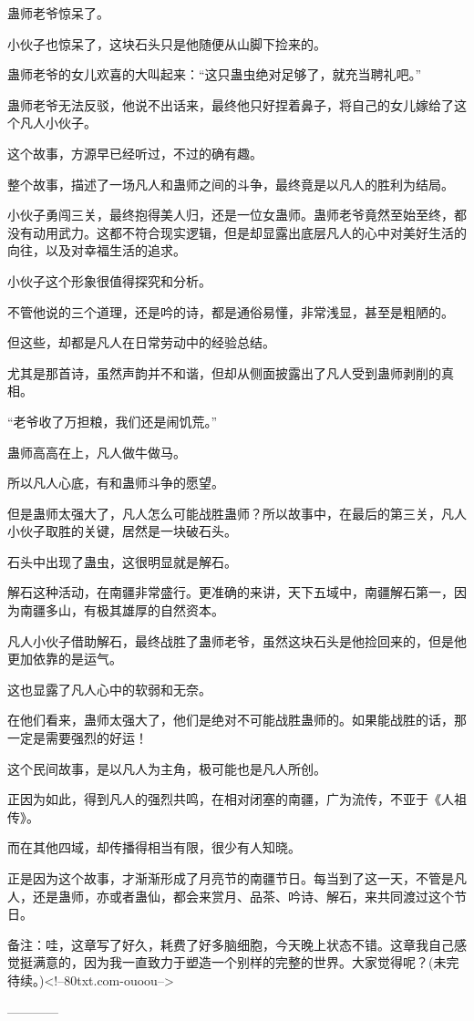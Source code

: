 \begin{this_body}
蛊师老爷惊呆了。

小伙子也惊呆了，这块石头只是他随便从山脚下捡来的。

蛊师老爷的女儿欢喜的大叫起来：“这只蛊虫绝对足够了，就充当聘礼吧。”

蛊师老爷无法反驳，他说不出话来，最终他只好捏着鼻子，将自己的女儿嫁给了这个凡人小伙子。

这个故事，方源早已经听过，不过的确有趣。

整个故事，描述了一场凡人和蛊师之间的斗争，最终竟是以凡人的胜利为结局。

小伙子勇闯三关，最终抱得美人归，还是一位女蛊师。蛊师老爷竟然至始至终，都没有动用武力。这都不符合现实逻辑，但是却显露出底层凡人的心中对美好生活的向往，以及对幸福生活的追求。

小伙子这个形象很值得探究和分析。

不管他说的三个道理，还是吟的诗，都是通俗易懂，非常浅显，甚至是粗陋的。

但这些，却都是凡人在日常劳动中的经验总结。

尤其是那首诗，虽然声韵并不和谐，但却从侧面披露出了凡人受到蛊师剥削的真相。

“老爷收了万担粮，我们还是闹饥荒。”

蛊师高高在上，凡人做牛做马。

所以凡人心底，有和蛊师斗争的愿望。

但是蛊师太强大了，凡人怎么可能战胜蛊师？所以故事中，在最后的第三关，凡人小伙子取胜的关键，居然是一块破石头。

石头中出现了蛊虫，这很明显就是解石。

解石这种活动，在南疆非常盛行。更准确的来讲，天下五域中，南疆解石第一，因为南疆多山，有极其雄厚的自然资本。

凡人小伙子借助解石，最终战胜了蛊师老爷，虽然这块石头是他捡回来的，但是他更加依靠的是运气。

这也显露了凡人心中的软弱和无奈。

在他们看来，蛊师太强大了，他们是绝对不可能战胜蛊师的。如果能战胜的话，那一定是需要强烈的好运！

这个民间故事，是以凡人为主角，极可能也是凡人所创。

正因为如此，得到凡人的强烈共鸣，在相对闭塞的南疆，广为流传，不亚于《人祖传》。

而在其他四域，却传播得相当有限，很少有人知晓。

正是因为这个故事，才渐渐形成了月亮节的南疆节日。每当到了这一天，不管是凡人，还是蛊师，亦或者蛊仙，都会来赏月、品茶、吟诗、解石，来共同渡过这个节日。

备注：哇，这章写了好久，耗费了好多脑细胞，今天晚上状态不错。这章我自己感觉挺满意的，因为我一直致力于塑造一个别样的完整的世界。大家觉得呢？(未完待续。)<!--80txt.com-ouoou-->

------------

\end{this_body}

